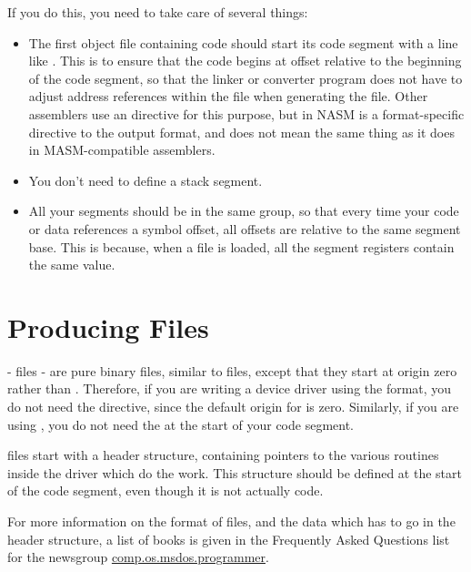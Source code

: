 If you do this, you need to take care of several things:

\begin{itemize}
    \item{The first object file containing code should start its code
        segment with a line like . This is to ensure
        that the code begins at offset  relative to the beginning
        of the code segment, so that the linker or converter program does
        not have to adjust address references within the file when generating
        the  file. Other assemblers use an  directive
        for this purpose, but  in NASM is a format-specific directive
        to the  output format, and does not mean the same thing as
        it does in MASM-compatible assemblers.}
    \item{You don't need to define a stack segment.}
    \item{All your segments should be in the same group, so that every time
        your code or data references a symbol offset, all offsets are
        relative to the same segment base. This is because, when a 
        file is loaded, all the segment registers contain the same value.}
\end{itemize}

\section{Producing  Files}
\label{sec:sysfiles}

 -  files - are pure binary files,
similar to  files, except that they start at origin zero
rather than . Therefore, if you are writing a device driver
using the  format, you do not need the  directive,
since the default origin for  is zero. Similarly, if you are
using , you do not need the  at the start of
your code segment.

 files start with a header structure, containing pointers to
the various routines inside the driver which do the work. This
structure should be defined at the start of the code segment, even
though it is not actually code.

For more information on the format of  files, and the data
which has to go in the header structure, a list of books is given in
the Frequently Asked Questions list for the newsgroup
\href{news:comp.os.msdos.programmer}{comp.os.msdos.programmer}.

